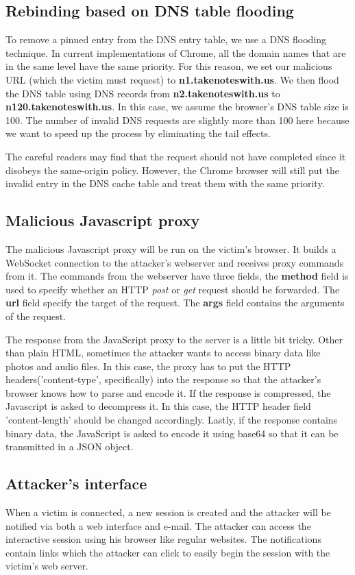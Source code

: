 \subsection{Rebinding based on DNS table flooding}
To remove a pinned entry from the DNS entry table, we use a DNS flooding technique. In current implementations of Chrome, all the domain names that are in the same level have the same priority. For this reason, we set our malicious URL (which the victim must request) to \textbf{n1.takenoteswith.us}.
We then flood the DNS table using DNS records from \textbf{n2.takenoteswith.us} to \textbf{n120.takenoteswith.us}. In this case, we assume the browser's DNS table size is 100. The number of invalid DNS requests are slightly more than 100 here because we want to speed up the process by eliminating the tail effects.

The careful readers may find that the request should not have completed since it disobeys the same-origin policy. However, the Chrome browser will still put the invalid entry in the DNS cache table and treat them with the same priority. 

\subsection{Malicious Javascript proxy}
The malicious Javascript proxy will be run on the victim's browser. It builds a WebSocket connection to the attacker's webserver and receives proxy commands from it. The commands from the webserver have three fields, the \textbf{method} field is used to specify whether an HTTP \emph{post} or \emph{get} request should be forwarded. The \textbf{url} field specify the target of the request. The \textbf{args} field contains the arguments of the request.

The response from the JavaScript proxy to the server is a little bit tricky. Other than plain HTML, sometimes the attacker wants to access binary data like photos and audio files. In this case, the proxy has to put the HTTP headers('content-type', specifically) into the response so that the attacker's browser knows how to parse and encode it. If the response is compressed, the Javascript is asked to decompress it. In this case, the HTTP header field 'content-length' should be changed accordingly. Lastly, if the response contains binary data, the JavaScript is asked to encode it using base64 so that it can be transmitted in a JSON object. 

\subsection{Attacker's interface}
When a victim is connected, a new session is created and the attacker will be notified via both a web interface and e-mail. The attacker can access the interactive session using his browser like regular websites. The notifications contain links which the attacker can click to easily begin the session with the victim's web server.

